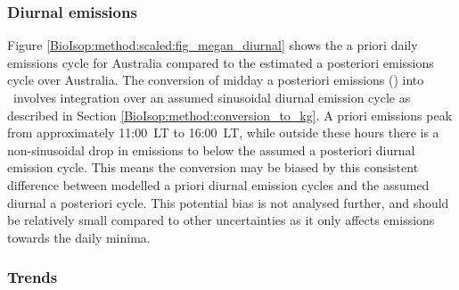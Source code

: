     \subsubsection{Diurnal emissions}
    
      Figure \ref{BioIsop:method:scaled:fig_megan_diurnal} shows the a priori daily emissions cycle for Australia compared to the estimated a posteriori emissions cycle over Australia.
      The conversion of midday a posteriori emissions (\moleccms) into \tgpyr ~involves integration over an assumed sinusoidal diurnal emission cycle as described in Section \ref{BioIsop:method:conversion_to_kg}.
      A priori emissions peak from approximately 11:00~LT to 16:00~LT, while outside these hours there is a non-sinusoidal drop in emissions to below the assumed a posteriori diurnal emission cycle.
      This means the conversion may be biased by this consistent difference between modelled a priori diurnal emission cycles and the assumed diurnal a posteriori cycle.
      This potential bias is not analysed further, and should be relatively small compared to other uncertainties as it only affects emissions towards the daily minima.
      
    
    \subsubsection{Trends}
    
